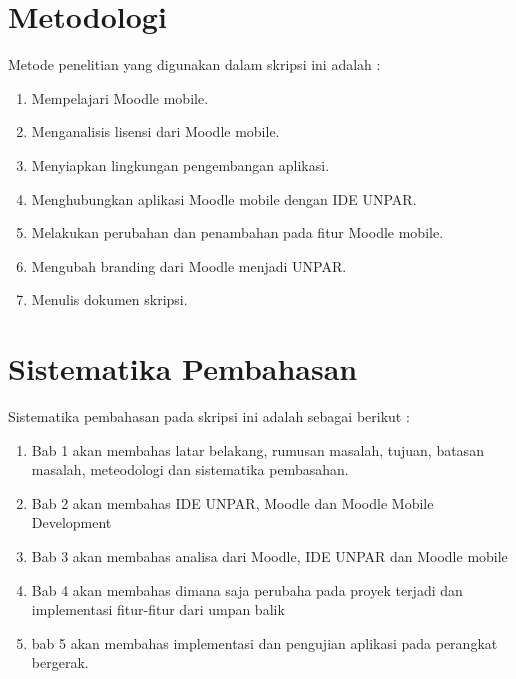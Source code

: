 \section{Metodologi}
\label{sec:metlit}
Metode penelitian yang digunakan dalam skripsi ini adalah :
\begin{enumerate}
		\item Mempelajari Moodle mobile.
		\item Menganalisis lisensi dari Moodle mobile.
		\item Menyiapkan lingkungan pengembangan aplikasi.
		\item Menghubungkan aplikasi Moodle mobile dengan IDE UNPAR.
		\item Melakukan perubahan dan penambahan pada fitur Moodle mobile.
		\item Mengubah branding dari Moodle menjadi UNPAR.
		\item Menulis dokumen skripsi.
\end{enumerate}

\section{Sistematika Pembahasan}
\label{sec:sispem}
 Sistematika pembahasan pada skripsi ini adalah sebagai berikut :
 \begin{enumerate}
 	\item Bab 1 akan membahas latar belakang, rumusan masalah, tujuan, batasan masalah, meteodologi dan sistematika pembasahan.
 	\item Bab 2 akan membahas IDE UNPAR, Moodle dan Moodle Mobile Development
	\item Bab 3 akan membahas analisa dari Moodle, IDE UNPAR dan Moodle mobile
	\item Bab 4 akan membahas dimana saja perubaha pada proyek terjadi dan implementasi fitur-fitur dari umpan balik
	\item bab 5 akan membahas implementasi dan pengujian aplikasi pada perangkat bergerak.
 \end{enumerate}